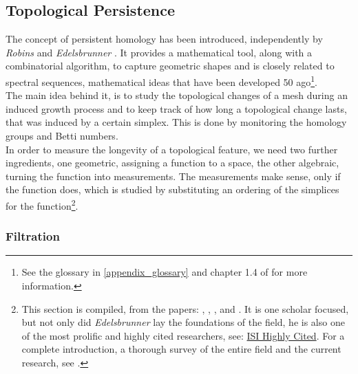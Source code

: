 \subsection{Topological Persistence}
\label{math_topological_persistance}

The concept of persistent homology has been introduced, independently by \textit{Robins} \citep[][]{Robins1999} and \textit{Edelsbrunner} \citep[cf.][]{Edelsbrunner2000}.
It provides a mathematical tool, along with a combinatorial algorithm, to capture geometric shapes and is closely related to spectral sequences, mathematical ideas that have been developed 50 ago\footnote{ See the glossary in \ref{appendix_glossary} and chapter 1.4 of \citep[][]{Zomorodian2005} for more information.}.\\
The main idea behind it, is to study the topological changes of a mesh during an induced growth process and to keep track of how long a topological change lasts, that was induced by a  certain simplex.
This is done by monitoring the homology groups and Betti numbers.\\
In order to measure the longevity of a topological feature, we need two further ingredients, one geometric, assigning a function to a space, the other algebraic, turning the function into measurements.
The measurements make sense, only if the function does, which is studied by substituting an ordering of the simplices for the function\footnote{ This section is compiled, from the papers: \citep[cf.][]{Delfinado1995}, \citep[cf.][]{Edelsbrunner2000}, \citep[cf.][]{Edelsbrunner2001}, \citep[cf.][]{Zomorodian2008} and \citep[cf.][]{Edelsbrunner2006}. It is one scholar focused, but not only did \textit{Edelsbrunner} lay the foundations of the field, he is also one of the most prolific and highly cited researchers, see: \href{http://researchanalytics.thomsonreuters.com/highlycited/categories/computer_science/}{ISI Highly Cited}. For a complete introduction, a thorough survey of the entire field and the current research, see \citep[][]{Kozlov2008}.}.

\subsubsection{Filtration}
\label{math_filtration}


